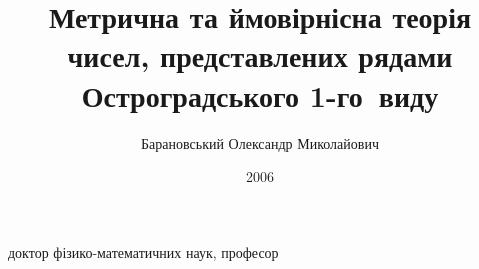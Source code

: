 \documentclass{vakthesis}
\theoremstyle{plain}
\theoremstyle{definition}
\theoremstyle{remark}
\begin{document}
\title{Метрична та ймовірнісна теорія чисел,
       представлених рядами Остроградського 1-го~виду}
\author{Барановський Олександр Миколайович}
           {доктор фізико-математичних наук, професор}
\date{2006}

\maketitle

\tableofcontents

\end{document}
